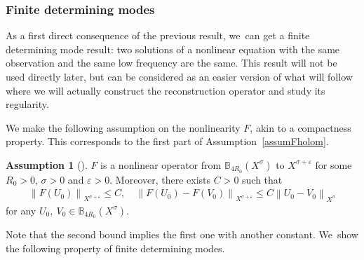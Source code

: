 \documentclass[11pt]{article}
\theoremstyle{definition}
\newtheorem{assum}{Assumption}
\newenvironment{assump}[2][]
{\renewcommand\theassum{#2}\begin{assum}[#1]}
{\end{assum}}
\let\veps\varepsilon
\newcommand\nor[2]{\left\|#1\right\|_{#2}}
\begin{document}
\subsubsection{Finite determining modes}
As a first direct consequence of the previous result, we~can get a finite determining mode result: two solutions of a nonlinear equation with the same observation and the same low frequency are the same. This result will not be used directly later, but can be considered as an easier version of what will follow where we will actually construct the reconstruction operator and study its regularity.

We make the following assumption on the nonlinearity $F$, akin to a compactness property. This corresponds to the first part of Assumption~\ref{assumFholom}.

\begin{assump}{3a}
\label{assumF}
$F$ is a nonlinear operator from $\mathbb{B}_{4R_{0}}(X^{\sigma})$ to $X^{\sigma+\veps}$ for some $R_{0}>0$, $\sigma>0$ and $\veps>0$. Moreover, there exists $C>0$ such that
\begin{align}
\label{boundF}
\nor{F(U_{0})}{X^{\sigma+\veps}}\leq C,\quad \nor{F(U_{0})-F(V_{0})}{X^{\sigma+\veps}}\leq C \nor{U_{0}-V_{0}}{X^{\sigma}}
\end{align}
for any $U_{0},~V_{0}\in \mathbb{B}_{4R_{0}}(X^{\sigma})$.
\end{assump}

Note that the second bound implies the first one with another constant. We~show the following property of finite determining modes.
\end{document}
